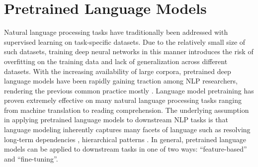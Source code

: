 
\section{Pretrained Language Models}
\label{lm}

Natural language processing tasks have traditionally been addressed with supervised learning on task-specific datasets.
Due to the relatively small size of such datasets, training deep neural networks in this manner introduces the risk of overfitting on the training data and lack of generalization across different datasets.
With the increasing availability of large corpora, pretrained deep language models have been rapidly gaining traction among NLP researchers, rendering the previous common practice mostly .
Language model pretraining has proven extremely effective on many natural language processing tasks ranging from machine translation to reading comprehension.
The underlying assumption in applying pretrained language models to downstream NLP tasks is that language modeling inherently captures many facets of language such as resolving long-term dependencies \cite{DBLP:journals/corr/LinzenDG16}, hierarchical patterns \cite{DBLP:journals/corr/abs-1803-11138}.
In general, pretrained language models can be applied to downstream tasks in one of two ways: ``feature-based'' and ``fine-tuning''.

